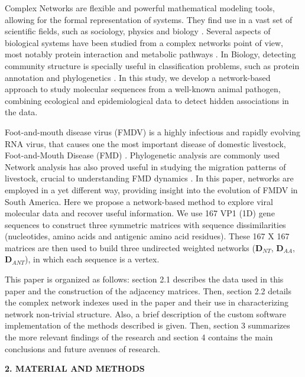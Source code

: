 \documentclass[12pt]{article}
\begin{document}
Complex Networks are flexible and powerful mathematical modeling tools, allowing  for the formal representation of systems.
They find use in a vast set of scientific fields, such as sociology, physics and biology \cite{Barabasi2004,newman,surprise1,surprise2,watts,guell2012}.
Several aspects of biological systems have been studied from a complex networks point of view, most notably protein interaction and metabolic pathways \cite{GoesNeto2010, surprise2, metabolic, guell2012}.
In Biology, detecting community structure is specially useful in classification problems, such as protein annotation \cite{surprise2} and phylogenetics \cite{Andrade2011}.
In this study, we develop a network-based approach to study molecular sequences from a well-known animal pathogen, combining ecological and epidemiological data to detect hidden associations in the data.

Foot-and-mouth disease virus (FMDV) is a highly infectious and rapidly evolving RNA virus, that causes one the most important disease of domestic livestock, Foot-and-Mouth Disease (FMD) \cite{Malirat2007, Perez2001, Malirat2012A, andean, Carvalho2012}.
Phylogenetic analysis are commonly used 
Network analysis has also proved useful in studying the migration patterns of livestock, crucial to understanding FMD dynamics \cite{review,cattle}.
In this paper, networks are employed in a yet different way, providing insight into the evolution of FMDV in South America.
Here we propose a network-based method to explore viral molecular data and recover useful information.
We use 167 VP1 (1D) gene sequences to construct three symmetric matrices with sequence dissimilarities (nucleotides, amino acids and antigenic amino acid residues).
These 167 X 167 matrices are then used to build three undirected weighted networks ($\mathbf{D}_{NT}$, $\mathbf{D}_{AA}$, $\mathbf{D}_{ANT}$), in which each sequence is a vertex.

This paper is organized as follows: section 2.1 describes the data used in this paper and the construction of the adjacency matrices.
Then, section 2.2 details the complex network indexes used in the paper and their use in characterizing network non-trivial structure.
Also, a brief description of the custom software implementation of the methods described is given.
Then, section 3 summarizes the more relevant findings of the research and section 4 contains the main conclusions and future avenues of research.

\bigskip
\bigskip

\textbf{2. MATERIAL AND METHODS}
\end{document}
